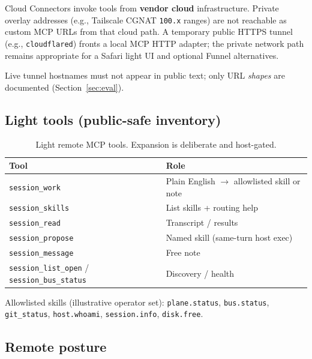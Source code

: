 \documentclass[11pt,a4paper]{article}
\begin{document}
Cloud Connectors invoke tools from \textbf{vendor cloud} infrastructure. Private
overlay addresses (e.g., Tailscale CGNAT \texttt{100.x} ranges) are not reachable as
custom MCP URLs from that cloud path. A temporary public HTTPS tunnel (e.g.,
\texttt{cloudflared}) fronts a local MCP HTTP adapter; the private network path
remains appropriate for a Safari light UI and optional Funnel alternatives.

Live tunnel hostnames must not appear in public text; only URL \emph{shapes} are
documented (Section~\ref{sec:eval}).

\subsection{Light tools (public-safe inventory)}

\begin{table}[h]
\centering
\small
\begin{tabularx}{\textwidth}{@{}lX@{}}
\toprule
\textbf{Tool} & \textbf{Role} \\
\midrule
\texttt{session\_work} & Plain English $\rightarrow$ allowlisted skill or note \\
\texttt{session\_skills} & List skills + routing help \\
\texttt{session\_read} & Transcript / results \\
\texttt{session\_propose} & Named skill (same-turn host exec) \\
\texttt{session\_message} & Free note \\
\texttt{session\_list\_open} / \texttt{session\_bus\_status} & Discovery / health \\
\bottomrule
\end{tabularx}
\caption{Light remote MCP tools. Expansion is deliberate and host-gated.}
\label{tab:tools}
\end{table}

Allowlisted skills (illustrative operator set): \texttt{plane.status},
\texttt{bus.status}, \texttt{git\_status}, \texttt{host.whoami},
\texttt{session.info}, \texttt{disk.free}.

\subsection{Remote posture}
\end{document}
